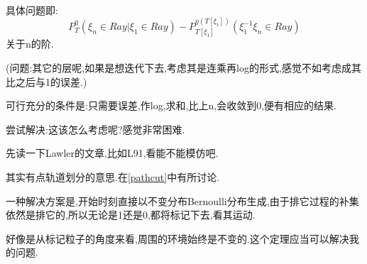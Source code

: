 \documentclass[a4paper,oneside]{ctexbook}
\begin{document}
					\begin{tri}[计算下移后的误差]
						\label{error}
						\ 

						具体问题即:
						$$P^{\eta}_T ( \xi_n \in Ray | \xi_1 \in Ray)-P^{\eta(T[\xi_1])}_{T[\xi_1]} ( \xi_1^{-1}\xi_n \in Ray )$$
						关于n的阶.

						(问题:其它的层呢,如果是想迭代下去,考虑其是连乘再log的形式,感觉不如考虑成其比之后与1的误差.)

						可行充分的条件是:只需要误差,作log,求和,比上n,会收敛到0,便有相应的结果.

						尝试解决:这该怎么考虑呢?感觉非常困难.


					\end{tri}

					\begin{tri}[去环的结论]
						\label{LE}
						先读一下Lawler的文章,比如L91,看能不能模仿吧.

						其实有点轨道划分的意思.在\ref{pathcut}中有所讨论.
					\end{tri}

					\begin{que}
						
						一种解决方案是,开始时刻直接以不变分布Bernoulli分布生成,由于排它过程的补集依然是排它的,所以无论是1还是0,都将标记下去,看其运动.

						好像是从标记粒子的角度来看,周围的环境始终是不变的.这个定理应当可以解决我的问题.

					\end{que}
\end{document}
